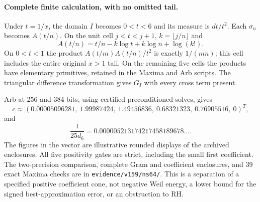 \paragraph{Complete finite calculation, with no omitted tail.}
Under $t=1/x$, the domain $I$ becomes $0<t<6$ and its measure is
$dt/t^2$. Each $\sigma_n$ becomes $A(t/n)$. On the unit cell
$j<t<j+1$, $k=\lfloor j/n\rfloor$ and
\[
 A(t/n)=t/n-k\log t+k\log n+\log(k!).
\]
On $0<t<1$ the product $A(t/m)A(t/n)/t^2$ is exactly $1/(mn)$;
this cell includes the entire original $x>1$ tail. On the remaining
five cells the products have elementary primitives, retained in the
Maxima and Arb scripts. The triangular difference transformation gives
$G_I$ with every cross term present.

Arb at 256 and 384 bits, using certified preconditioned solves, gives
\[
 c\approx(0.00005096281,\ 1.99987424,\ 1.49456836,\
            0.68321323,\ 0.76905516,\ 0)^T,
\]
and
\[
 \frac1{25d_6}=0.000005213174217458189678\ldots.
\]
The figures in the vector are illustrative rounded displays of the
archived enclosures. All five positivity gates are strict, including
the small first coefficient. The two-precision comparison, complete
Gram and coefficient enclosures, and 39 exact Maxima checks are in
\texttt{evidence/v159/ns64/}. This is a separation of a specified
positive coefficient cone, not negative Weil energy, a lower bound for
the signed best-approximation error, or an obstruction to RH.
